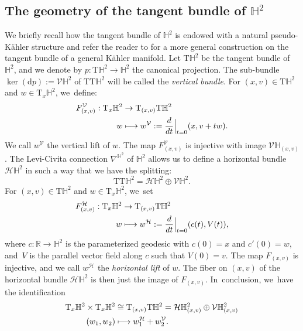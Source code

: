 \documentclass[11pt]{article}
\newcommand\mto{\mathchoice{\longmapsto}{\mapsto}{\mapsto}{\mapsto}}
\theoremstyle{plain}
\theoremstyle{definition}
\begin{document}
\subsection{The geometry of the tangent bundle of \texorpdfstring{$\mathbb{H}^2$}{H2}}
\label{The_geometry_of_the_tangent bundle}
We briefly recall how the tangent bundle of $\mathbb{H}^2$ is endowed with a natural pseudo-Kähler structure and refer the reader to \cite{canonical_pseudo} for a more general construction on the tangent bundle of a general Kähler manifold. Let $\mathrm{T}\mathbb{H}^2$ be the tangent bundle of $\mathbb{H}^2$, and we denote by $p:\mathrm{T}\mathbb{H}^2\to\mathbb{H}^2$ the canonical projection. The sub-bundle $\ker(\mathrm{d}p) := \mathcal{V}\mathbb{H}^2$ of $\mathrm{T}\mathrm{T}\mathbb{H}^2$ will be called the \emph{vertical bundle}. For $(x,v)\in \mathrm{T}\mathbb{H}^2$ and $w\in\mathrm{T}_x\mathbb{H}^2$, we~define:
\[
\begin{aligned}
F^{\mathcal{V}}_{(x,v)}: \mathrm{T}_x\mathbb{H}^2 & \to \mathrm{T}_{(x,v)}\mathrm{T}\mathbb{H}^2 \\
w &\mto w^{\mathcal{V}}:=\frac{d}{dt}\Big\lvert_{t=0} (x,v+tw).
\end{aligned}
\]
We call $w^{\mathcal{V}}$ the vertical lift of $w$. The map $F^{\mathcal{V}}_{(x,v)}$ is injective with image $\mathcal{V}\mathbb{H}_{(x,v)}$.
The Levi-Civita connection $\nabla^{\mathbb{H}^2}$ of $\mathbb{H}^2$ allows us to define a horizontal bundle $\mathcal{H}\mathbb{H}^2$ in such a way that we have the splitting:
\[
\mathrm{T}\mathrm{T}\mathbb{H}^2=\mathcal{H}\mathbb{H}^2\oplus \mathcal{V}\mathbb{H}^2.
\]
For $(x,v)\in \mathrm{T}\mathbb{H}^2$ and $w\in\mathrm{T}_x\mathbb{H}^2$, we~set
\[
\begin{aligned}
F_{(x,v)}^{\mathcal{H}}:\mathrm{T}_x\mathbb{H}^2 & \to \mathrm{T}_{(x,v)}\mathrm{T}\mathbb{H}^2 \\
w &\mto w^{\mathcal{H}}:=\frac{d}{dt}\Big\lvert_{t=0} (c(t),V(t)),
\end{aligned}
\]
where $c:\mathbb{R}\to\mathbb{H}^2$ is the parameterized geodesic with $c(0)=x$ and $c'(0)=w$, and~$V$ is the parallel vector field along $c$ such that $V(0)=v$. The map $F_{(x,v)}$ is injective, and we call $w^{\mathcal{H}}$ the \emph{horizontal lift} of $w$. The fiber on $(x,v)$ of the horizontal bundle $\mathcal{H}\mathbb{H}^2$ is then just the image of $F_{(x,v)}$. In~conclusion, we~have the identification
\begin{equation}\label{splittangent}
\begin{aligned}
\mathrm{T}_x\mathbb{H}^2\times \mathrm{T}_x\mathbb{H}^2 & \cong \mathrm{T}_{(x,v)}\mathrm{T}\mathbb{H}^2=\mathcal{H}\mathbb{H}^2_{(x,v)}\oplus \mathcal{V}\mathbb{H}^2_{(x,v)} \\
(w_1,w_2) & \mto w_1^{\mathcal{H}}+w_2^{\mathcal{V}}.
\end{aligned}
\end{equation}
\end{document}
